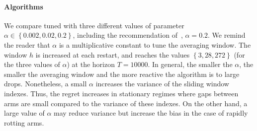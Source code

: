 \paragraph{Algorithms} We compare \wSWA tuned with three different values of parameter $\alpha \in \left\{ 0.002, 0.02, 0.2\right\}$, including the recommendation of~\citet{levine2017rotting}, $\alpha = 0.2$.  We remind the reader that $\alpha$ is a multiplicative constant to tune the averaging window. The window $h$ is increased at each restart, and reaches the values $\left\{3, 28, 272\right\}$ (for the three values of $\alpha$) at the horizon $T=10 000$. In general, the smaller the $\alpha$, the smaller the averaging window and the more reactive the algorithm is to large drops. Nonetheless, a small $\alpha$ increases the variance of the sliding window indexes. Thus, the regret increases in stationary regimes where gaps between arms are small compared to the variance of these indexes. On the other hand, a large value of $\alpha$ may reduce variance but increase the bias in the case of rapidly rotting arms. 


